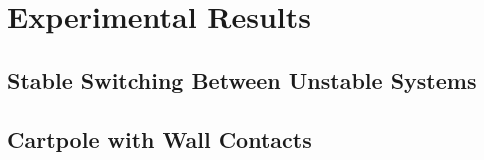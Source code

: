 \section{Experimental Results}
\label{sec:moe_results}

\subsection{Stable Switching Between Unstable Systems}

\subsection{Cartpole with Wall Contacts}